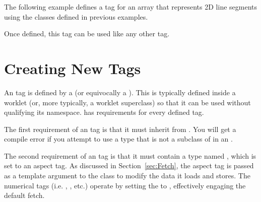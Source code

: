 The following example defines a \controlsignature tag for an array that represents 2D line segments using the classes defined in previous examples.


Once defined, this tag can be used like any other \controlsignature tag.




\section{Creating New \protect\executionsignature Tags}
\label{sec:NewExecutionSignatureTags}


An \executionsignature tag is defined by a  (or equivocally a ).
This  is typically defined inside a worklet (or, more typically, a worklet superclass) so that it can be used without qualifying its namespace.
\VTKm has requirements for every defined \executionsignature tag.

The first requirement of an \executionsignature tag is that it must inherit from .
You will get a compile error if you attempt to use a type that is not a subclass of  in an \executionsignature.


The second requirement of an \executionsignature tag is that it must contain a type named , which is set to an aspect tag.
As discussed in Section~\ref{sec:Fetch}, the aspect tag is passed as a template argument to the  class to modify the data it loads and stores.
The numerical \executionsignature tags (i.e. , , etc.) operate by setting the  to ,  effectively engaging the default fetch.


